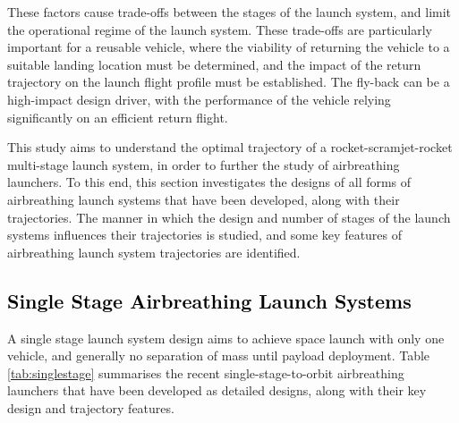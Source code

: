 These factors cause trade-offs between the stages of the launch system\cite{Staufenbiel2000}, and limit the operational regime of the launch system.
These trade-offs are particularly important for a reusable vehicle, where the viability of returning the vehicle to a suitable landing location must be determined, and the impact of the return trajectory on the launch flight profile must be established. The fly-back can be a high-impact design driver, with the performance of the vehicle relying significantly on an efficient return flight\cite{Tetlow1992,Hellman}. 

This study aims to understand the optimal trajectory of a rocket-scramjet-rocket multi-stage launch system, in order to further the study of airbreathing launchers. 
To this end, this section investigates the designs of all forms of airbreathing launch systems that have been developed, along with their trajectories. The manner in which the design and number of stages of the launch systems influences their trajectories is studied, and some key features of airbreathing launch system trajectories are identified.
  
 
  
 
  
 \textcolor{black}{
  \subsection{Single Stage Airbreathing Launch Systems}
}

\noindent
A single stage launch system design aims to achieve space launch with only one vehicle, and generally no separation of mass until payload deployment. Table \ref{tab:singlestage} summarises the recent single-stage-to-orbit airbreathing launchers that have been developed as detailed designs, along with their key design and trajectory features. 

